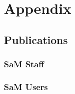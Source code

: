\chapter{Appendix}
\renewcommand{\chaptername}{}

\section*{Publications}
\subsection*{SaM Staff}


\subsection*{SaM Users}
